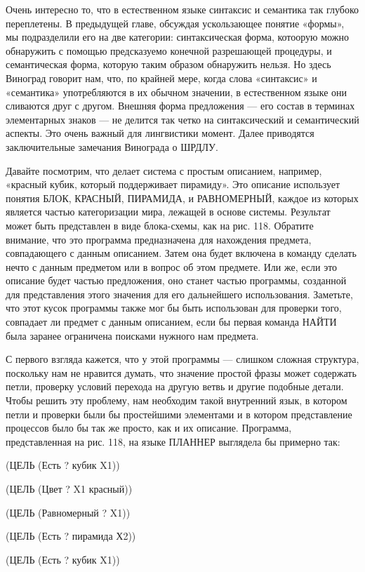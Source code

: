 Очень интересно то, что в естественном языке синтаксис и семантика так глубоко переплетены. В предыдущей главе, обсуждая ускользающее понятие «формы», мы подразделили его на две категории: синтаксическая форма, котоорую можно обнаружить с помощью предсказуемо конечной разрешающей процедуры, и семантическая форма, которую таким образом обнаружить нельзя. Но здесь Виноград говорит нам, что, по крайней мере, когда слова «синтаксис» и «семантика» употребляются в их обычном значении, в естественном языке они сливаются друг с другом. Внешняя форма предложения --- его состав в терминах элементарных знаков --- не делится так четко на синтаксический и семантический аспекты. Это очень важный для лингвистики момент. Далее приводятся заключительные замечания Винограда о ШРДЛУ.

Давайте посмотрим, что делает система с простым описанием, например, «красный кубик, который поддерживает пирамиду». Это описание использует понятия БЛОК, КРАСНЫЙ, ПИРАМИДА, и РАВНОМЕРНЫЙ, каждое из которых является частью категоризации мира, лежащей в основе системы. Результат может быть представлен в виде блока-схемы, как на рис. 118. Обратите внимание, что это программа предназначена для нахождения предмета, совпадающего с данным описанием. Затем она будет включена в команду сделать нечто с данным предметом или в вопрос об этом предмете. Или же, если это описание будет частью предложения, оно станет частью программы, созданной для представления этого значения для его дальнейшего использования. Заметьте, что этот кусок программы также мог бы быть использован для проверки того, совпадает ли предмет с данным описанием, если бы первая команда НАЙТИ была заранее ограничена поисками нужного нам предмета.

С первого взгляда кажется, что у этой программы --- слишком сложная структура, поскольку нам не нравится думать, что значение простой фразы может содержать петли, проверку условий перехода на другую ветвь и другие подобные детали. Чтобы решить эту проблему, нам необходим такой внутренний язык, в котором петли и проверки были бы простейшими элементами и в котором представление процессов было бы так же просто, как и их описание. Программа, представленная на рис. 118, на языке ПЛАННЕР выглядела бы примерно так:

(ЦЕЛЬ (Есть ? кубик X1))

(ЦЕЛЬ (Цвет ? X1 красный))

(ЦЕЛЬ (Равномерный ? X1))

(ЦЕЛЬ (Есть ? пирамида Х2))

(ЦЕЛЬ (Есть ? кубик X1))

